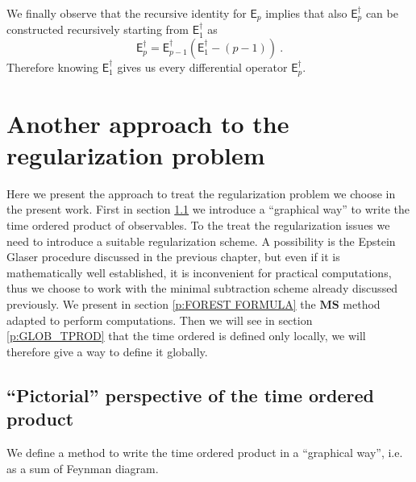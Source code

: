 \documentclass[11pt]{book}
\newcommand{\MS}{\textbf{MS}}
\newcommand{\Esf}{\mathsf{E}}
\theoremstyle{break}
\begin{document}
%
We finally observe that the recursive identity for $\Esf_p$ implies that also $\Esf^\dagger_p$ can be constructed recursively starting from $\Esf^\dagger_1$ as 
%
\begin{equation*}
\Esf_p^\dagger = \Esf_{p-1}^\dagger \left(\Esf_1^\dagger-(p-1)\right) \ . 
\end{equation*}
%
Therefore knowing $\Esf_1^\dagger$ gives us every differential operator $\Esf_p^\dagger$.


\section{Another approach to the regularization problem}
\label{p:ANOTHER_APPROACH}


Here we present the approach to treat the regularization problem we choose in the present work. First in section \ref{p:PIC_REG_PB} we introduce a ``graphical way'' to write the time ordered product of observables. To the treat the regularization issues we need to introduce a suitable regularization scheme. A possibility is the Epstein Glaser procedure discussed in the previous chapter, but even if it is mathematically well established, it is inconvenient for practical computations, thus we choose to work with the minimal subtraction scheme already discussed previously. We present in section \ref{p:FOREST FORMULA} the $\MS$ method adapted to perform computations. Then we will see in section \ref{p:GLOB_TPROD} that the time ordered is defined only locally, we will therefore give a way to define it globally. 


\subsection{``Pictorial'' perspective of the time ordered product}
\label{p:PIC_REG_PB}


We define a method to write the time ordered product in a ``graphical way'', i.e. as a sum of Feynman diagram. 


\bigskip
\end{document}
